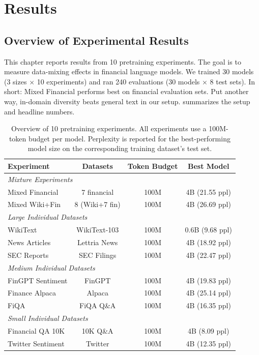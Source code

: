 \chapter{Results}


\section{Overview of Experimental Results}

This chapter reports results from 10 pretraining experiments. The goal is to measure data-mixing effects in financial language models. We trained 30 models (3 sizes $\times$ 10 experiments) and ran 240 evaluations (30 models $\times$ 8 test sets). In short: Mixed Financial performs best on financial evaluation sets. Put another way, in-domain diversity beats general text in our setup.  summarizes the setup and headline numbers.

\begin{table}[h]
\centering
\small
\begin{tabular}{lccc}
\toprule
\textbf{Experiment} & \textbf{Datasets} & \textbf{Token Budget} & \textbf{Best Model} \\
\midrule
\multicolumn{4}{l}{\textit{Mixture Experiments}} \\
Mixed Financial & 7 financial & 100M & 4B (21.55 ppl) \\
Mixed Wiki+Fin & 8 (Wiki+7 fin) & 100M & 4B (26.69 ppl) \\
\midrule
\multicolumn{4}{l}{\textit{Large Individual Datasets}} \\
WikiText & WikiText-103 & 100M & 0.6B (9.68 ppl) \\
News Articles & Lettria News & 100M & 4B (18.92 ppl) \\
SEC Reports & SEC Filings & 100M & 4B (22.47 ppl) \\
\midrule
\multicolumn{4}{l}{\textit{Medium Individual Datasets}} \\
FinGPT Sentiment & FinGPT & 100M & 4B (19.83 ppl) \\
Finance Alpaca & Alpaca & 100M & 4B (25.14 ppl) \\
FiQA & FiQA Q\&A & 100M & 4B (16.35 ppl) \\
\midrule
\multicolumn{4}{l}{\textit{Small Individual Datasets}} \\
Financial QA 10K & 10K Q\&A & 100M & 4B (8.09 ppl) \\
Twitter Sentiment & Twitter & 100M & 4B (12.35 ppl) \\
\bottomrule
\end{tabular}
\caption[Overview of Pretraining Experiments]{Overview of 10 pretraining experiments. All experiments use a 100M-token budget per model. Perplexity is reported for the best-performing model size on the corresponding training dataset's test set.}
\label{tab:experiments_overview}
\end{table}

